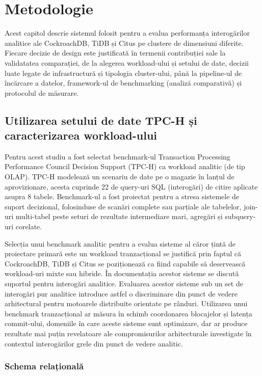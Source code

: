 \chapter{Metodologie}

Acest capitol descrie sistemul folosit pentru a evalua performanța interogărilor analitice ale CockroachDB, TiDB și Citus pe clustere de dimensiuni diferite. Fiecare decizie de design este justificată în termenii contribuției sale la validatatea comparației, de la alegerea workload-ului și setului de date, decizii luate legate de infrastructură și tipologia cluster-ului, până la pipeline-ul de încărcare a datelor, framework-ul de benchmarking (analiză comparativă) și protocolul de măsurare.

\section{Utilizarea setului de date TPC-H și caracterizarea workload-ului}

Pentru acest studiu a fost selectat benchmark-ul Transaction Processing Performance Council Decision Support (TPC-H) ca workload analitic (de tip OLAP). TPC-H modelează un scenariu de date pe o magazie în lanțul de aprovizionare, acesta cuprinde 22 de query-uri SQL (interogări) de citire aplicate asupra 8 tabele. Benchmark-ul a fost proiectat pentru a stresa sistemele de suport decizional, folosinduse de scanări complete sau parțiale ale tabelelor, join-uri multi-tabel peste seturi de rezultate intermediare mari, agregări și subquery-uri corelate.

Selecția unui benchmark analitic pentru a evalua sisteme al căror țintă de proiectare primară este un workload tranzacțional se justifică prin faptul că CockroachDB, TiDB și Citus se poziționează ca fiind capabile să deservească workload-uri mixte sau hibride. În documentația acestor sisteme se discută suportul pentru interogări analitice. Evaluarea acestor sisteme sub un set de interogări pur analitice introduce astfel o discriminare din punct de vedere arhitectural pentru motoarele distribuite orientate pe rânduri. Utilizarea unui benchmark tranzacțional ar măsura în schimb coordonarea blocajelor și latența commit-ului, domeniile în care aceste sisteme sunt optimizare, dar ar produce rezultate mai puțin revelatoare ale compromisurilor arhitecturale investigate în contextul interogărilor grele din punct de vedere analitic.

\subsection{Schema relațională}

